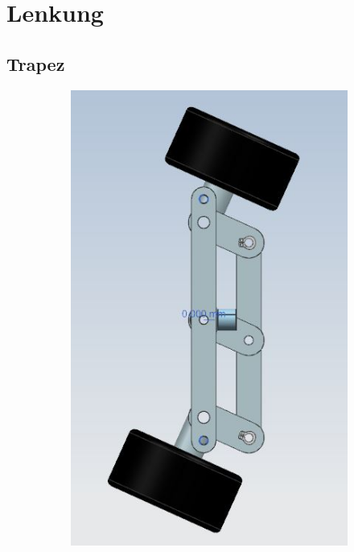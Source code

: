 
\section{Lenkung}


\subsection{Trapez}

\begin{figure} [hbp]
	\centering
	\begin{subfigure}[b]{0.4\textwidth}
		\includegraphics[width=\textwidth]{fig/Trapezlenkung3.JPG}

\end{subfigure}
\end{figure}
